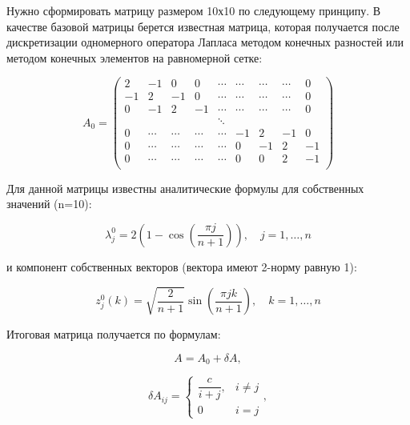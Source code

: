 \documentclass[a4paper]{article}
\begin{document}
Нужно сформировать матрицу размером 10х10 по следующему принципу. В качестве базовой матрицы берется известная матрица, которая получается после дискретизации одномерного оператора Лапласа методом конечных разностей или методом конечных элементов на равномерной сетке:

\begin{equation*}
A_0 = 
\begin{pmatrix}
2 & -1 & 0 & 0 & \cdots & \cdots & \cdots & \cdots & 0 \\
-1 & 2 & -1 & 0 & \cdots & \cdots & \cdots & \cdots & 0 \\
0 & -1 & 2 & -1 & \cdots & \cdots & \cdots & \cdots & 0 \\
 &  &  &  & \ddots &  &  &  &  \\
0 & \cdots & \cdots & \cdots & \cdots & -1 & 2 & -1 & 0 \\
0 & \cdots & \cdots & \cdots & \cdots & 0 & -1 & 2 & -1 \\
0 & \cdots & \cdots & \cdots & \cdots & 0 & 0 & 2 & -1 \\
\end{pmatrix}
\end{equation*}


Для данной матрицы известны аналитические формулы для собственных значений (n=10):

\begin{equation}\label{eigenval_orig}
\lambda^{0}_j = 2(1-\cos(\frac{\pi j}{n + 1})), \quad j = 1, \ldots, n
\end{equation}

и компонент собственных векторов (вектора имеют 2-норму равную 1):

\begin{equation}\label{eigenvec_orig}
z^{0}_j(k) = \sqrt{\frac{2}{n + 1}}\sin(\frac{\pi j k}{n + 1}), \quad k = 1, \ldots, n
\end{equation}

Итоговая матрица получается по формулам:

\begin{equation*}
A = A_0 + \delta A,
\end{equation*}

\begin{equation*}
\delta A_{ij} = 
\left\{\begin{matrix}
\dfrac{c}{i + j}, & i \neq j \\ 
0 & i = j
\end{matrix}\right.,
\end{equation*}
\end{document}
